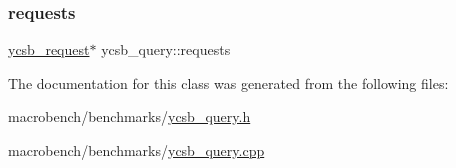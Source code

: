 \mbox{\label{classycsb__query_a2dfa57c2be74e3b38ccefe41e6a94eff}} 
\subsubsection{\texorpdfstring{requests}{requests}}
{\footnotesize\ttfamily \hyperlink{classycsb__request}{ycsb\+\_\+request}$\ast$ ycsb\+\_\+query\+::requests}



The documentation for this class was generated from the following files\+:\begin{DoxyCompactItemize}
\item 
macrobench/benchmarks/\hyperlink{ycsb__query_8h}{ycsb\+\_\+query.\+h}\item 
macrobench/benchmarks/\hyperlink{ycsb__query_8cpp}{ycsb\+\_\+query.\+cpp}\end{DoxyCompactItemize}
